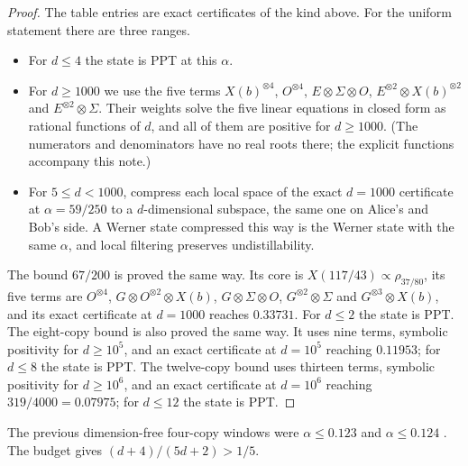 \documentclass[11pt]{article}
\theoremstyle{remark}
\begin{document}
\begin{proof}
The table entries are exact certificates of the kind above. For the uniform statement there are three ranges.
\begin{itemize}
\item For $d\le4$ the state is PPT at this $\alpha$.
\item For $d\ge1000$ we use the five terms $X(b)^{\otimes4}$, $O^{\otimes4}$, $E\otimes\Sigma\otimes O$,
$E^{\otimes2}\otimes X(b)^{\otimes2}$ and $E^{\otimes2}\otimes\Sigma$. Their weights solve the five linear equations in
closed form as rational functions of $d$, and all of them are positive for $d\ge1000$. (The numerators and
denominators have no real roots there; the explicit functions accompany this note.)
\item For $5\le d<1000$, compress each local space of the exact $d=1000$ certificate at $\alpha=59/250$ to a
$d$-dimensional subspace, the same one on Alice's and Bob's side. A Werner state compressed this way is the Werner
state with the same $\alpha$, and local filtering preserves undistillability.
\end{itemize}
The bound $67/200$ is proved the same way. Its core is $X(117/43)\propto\rho_{37/80}$, its five terms are
$O^{\otimes4}$, $G\otimes O^{\otimes2}\otimes X(b)$, $G\otimes\Sigma\otimes O$, $G^{\otimes2}\otimes\Sigma$ and
$G^{\otimes3}\otimes X(b)$, and its exact certificate at $d=1000$ reaches $0.33731$. For $d\le2$ the state is PPT.
The eight-copy bound is also proved the same way. It uses nine terms, symbolic positivity for $d\ge10^5$, and an exact
certificate at $d=10^5$ reaching $0.11953$; for $d\le8$ the state is PPT. The twelve-copy bound uses thirteen terms,
symbolic positivity for $d\ge10^6$, and an exact certificate at $d=10^6$ reaching $319/4000=0.07975$; for $d\le12$ the
state is PPT.
\end{proof}
The previous dimension-free four-copy windows were $\alpha\le0.123$ \cite{QGWG} and $\alpha\le0.124$ \cite{BGH}. The
budget gives $(d+4)/(5d+2)>1/5$.
\end{document}
